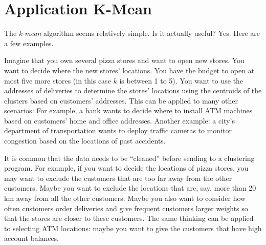 \section{Application K-Mean}

The {\it k-mean} algorithm seems relatively simple. Is it actually useful?
Yes. Here are a few examples.

Imagine that you own several pizza stores and want to open new stores.
You want to decide where the new stores' locations.  You have the
budget to open at most five more stores (in this case $k$ is between 1
to 5).  You want to use the addresses of deliveries to determine the
stores' locations using the centroids of the clusters based on
customers' addresses.  This can be applied to many other scenarios:
For example, a bank wants to decide where to install ATM machines
based on customers' home and office addresses.  Another example: a
city's department of transportation wants to deploy traffic cameras to
monitor congestion based on the locations of past accidents.


It is common that the data needs to be ``cleaned'' before sending to a
clustering program.  For example, if you want to decide the locations
of pizza stores, you may want to exclude the customers that are too
far away from the other customers. Maybe you want to exclude the
locations that are, say, more than 20 km away from all the other
customers.  Maybe you also want to consider how often customers order
deliveries and give frequent customers larger weights so that the
stores are closer to these customers.  The same thinking can be
applied to selecting ATM locations: maybe you want to give the
customers that have high account balances. 




